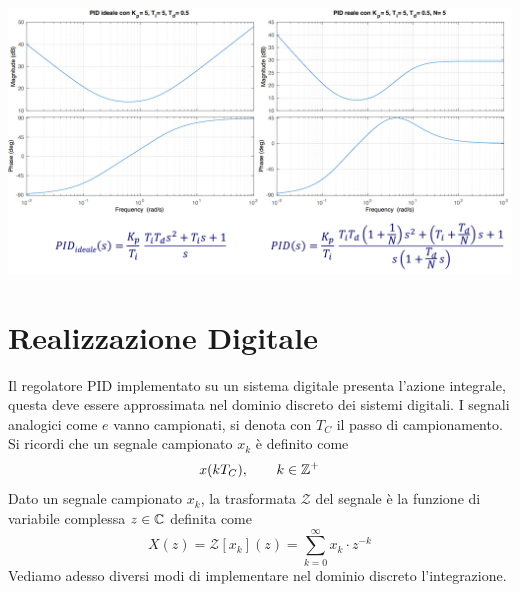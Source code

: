 \documentclass[10pt, letterpaper]{report}
\begin{document}
\begin{center}
    \includegraphics[width=1\textwidth]{images/PidRealevsPidIdeale.png}
\end{center}
\flowerLine 
\section{Realizzazione Digitale}
Il regolatore PID implementato su un sistema digitale presenta l'azione integrale, questa deve essere approssimata nel dominio discreto dei sistemi digitali. I segnali analogici come $e$ vanno campionati, si denota con $T_C$ il passo di campionamento. Si ricordi che 
un segnale campionato $x_k$ è definito come $$x(kT_C), \ \ \ \ \ \ k\in\Z^+$$
 Dato un segnale campionato $x_k$, la trasformata $\mathcal Z$ del segnale è la funzione di variabile complessa $z\in {\mathbb C}$ definita come
$$ X(z)=\mathcal Z[x_k](z)=\sum_{k=0}^\infty x_k\cdot z^{-k}$$
Vediamo adesso diversi modi di implementare nel dominio discreto l'integrazione.  
\end{document}
